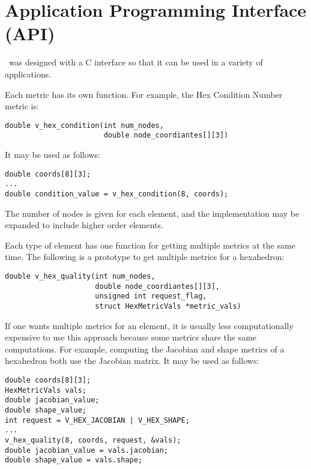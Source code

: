 \chapter{Application Programming Interface (API)}

\verd\ was designed with a C interface so that it can be used in a variety of
applications.

Each metric has its own function.  For example, the Hex Condition Number metric
is:

\begin{verbatim}
double v_hex_condition(int num_nodes, 
                       double node_coordiantes[][3])
\end{verbatim}

It may be used as follows:
\begin{verbatim}
double coords[8][3];
...
double condition_value = v_hex_condition(8, coords);
\end{verbatim}


The number of nodes is given for each element, and the implementation may be
expanded to include higher order elements.

Each type of element has one function for getting multiple metrics at the same
time.  The following is a prototype to get multiple metrics for a hexahedron:
\begin{verbatim}
double v_hex_quality(int num_nodes, 
                     double node_coordiantes[][3], 
                     unsigned int request_flag, 
                     struct HexMetricVals *metric_vals)
\end{verbatim}

If one wants multiple metrics for an element, it is usually less computationally
expensive to use this approach because some metrics share the same computations.
For example, computing the Jacobian and shape metrics of a hexahedron both use the 
Jacobian matrix.
It may be used as follows:
\begin{verbatim}
double coords[8][3];
HexMetricVals vals;
double jacobian_value;
double shape_value;
int request = V_HEX_JACOBIAN | V_HEX_SHAPE;
...
v_hex_quality(8, coords, request, &vals);
double jacobian_value = vals.jacobian;
double shape_value = vals.shape;
\end{verbatim}

